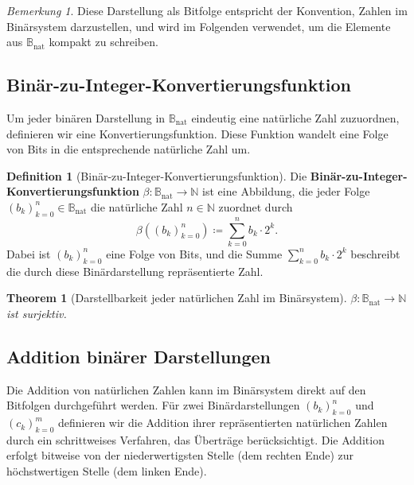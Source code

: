 \documentclass{book}
\theoremstyle{plain}
\newtheorem{theorem}{Theorem}
\theoremstyle{remark}
\newtheorem*{remark}{Bemerkung}
\theoremstyle{definition}
\newtheorem{definition}{Definition}[section]
\begin{document}
\begin{remark}
    Diese Darstellung als Bitfolge entspricht der Konvention, Zahlen im Binärsystem darzustellen, und wird im Folgenden verwendet, um die Elemente aus \( \mathbb{B}_{\text{nat}} \) kompakt zu schreiben.
\end{remark}

\subsection{Binär-zu-Integer-Konvertierungsfunktion}

Um jeder binären Darstellung in \( \mathbb{B}_{\text{nat}} \) eindeutig eine natürliche Zahl zuzuordnen, definieren wir eine Konvertierungsfunktion. Diese Funktion wandelt eine Folge von Bits in die entsprechende natürliche Zahl um.

\begin{definition}[Binär-zu-Integer-Konvertierungsfunktion]
    Die \textbf{Binär-zu-Integer-Konvertierungsfunktion} \( \beta : \mathbb{B}_{\text{nat}} \to \mathbb{N} \) ist eine Abbildung, die jeder Folge \( (b_k)_{k=0}^n \in \mathbb{B}_{\text{nat}} \) die natürliche Zahl \( n \in \mathbb{N} \) zuordnet durch
    \[
    \beta((b_k)_{k=0}^n) \coloneqq \sum_{k=0}^n b_k \cdot 2^k.
    \]
    Dabei ist \((b_k)_{k=0}^n\) eine Folge von Bits, und die Summe \( \sum_{k=0}^n b_k \cdot 2^k \) beschreibt die durch diese Binärdarstellung repräsentierte Zahl.
\end{definition}

\begin{theorem}[Darstellbarkeit jeder natürlichen Zahl im Binärsystem]
    \(\beta : \mathbb{B}_{\text{nat}} \to \mathbb{N} \) ist surjektiv.
\end{theorem}

\subsection{Addition binärer Darstellungen}

Die Addition von natürlichen Zahlen kann im Binärsystem direkt auf den Bitfolgen durchgeführt werden. Für zwei Binärdarstellungen \( (b_k)_{k=0}^n \) und \( (c_k)_{k=0}^m \) definieren wir die Addition ihrer repräsentierten natürlichen Zahlen durch ein schrittweises Verfahren, das Überträge berücksichtigt. Die Addition erfolgt bitweise von der niederwertigsten Stelle (dem rechten Ende) zur höchstwertigen Stelle (dem linken Ende). 
\end{document}
